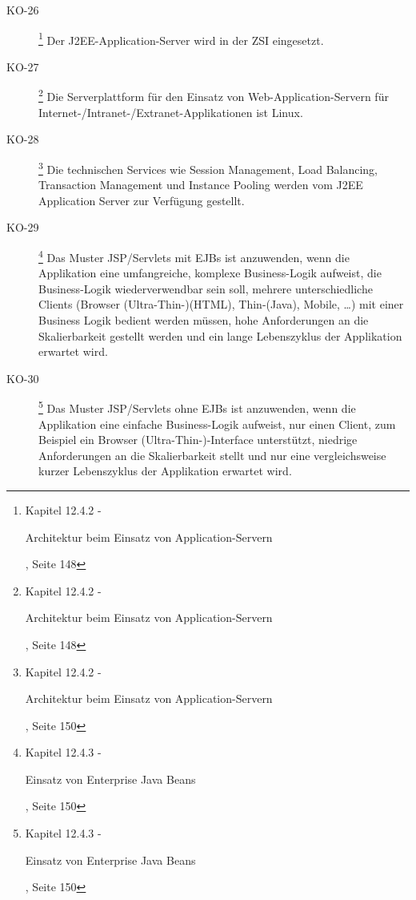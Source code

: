 \begin{description}
    \item[KO-26\label{itm:KO-26}]
    \footnote{\cite{ZkbHandbuchDerItArchitektur} Kapitel 12.4.2 -
    \begin{itshape}Architektur beim Einsatz von
    Application-Servern\end{itshape}, Seite 148}
    Der J2EE-Application-Server wird in der \ac{ZSI} eingesetzt.
    
    \item[KO-27\label{itm:KO-27}]
    \footnote{\cite{ZkbHandbuchDerItArchitektur} Kapitel 12.4.2 -
    \begin{itshape}Architektur beim Einsatz von
    Application-Servern\end{itshape}, Seite 148}
    Die Serverplattform für den Einsatz von Web-Application-Servern für
    Internet-/Intranet-/Extranet-Applikationen ist Linux.
    
    \item[KO-28\label{itm:KO-28}]
    \footnote{\cite{ZkbHandbuchDerItArchitektur} Kapitel 12.4.2 -
    \begin{itshape}Architektur beim Einsatz von
    Application-Servern\end{itshape}, Seite 150}
    Die technischen Services wie Session Management, Load Balancing,
    Transaction Management und Instance Pooling werden vom J2EE Application
    Server zur Verfügung gestellt.
    
    \item[KO-29\label{itm:KO-29}]
    \footnote{\cite{ZkbHandbuchDerItArchitektur} Kapitel 12.4.3 -
    \begin{itshape}Einsatz von Enterprise Java Beans\end{itshape}, Seite 150}
    Das Muster JSP/Servlets mit EJBs ist anzuwenden, wenn die Applikation eine
    umfangreiche, komplexe Business-Logik aufweist, die Business-Logik
    wiederverwendbar sein soll, mehrere unterschiedliche Clients (Browser
    (Ultra-Thin-)(HTML), Thin-(Java), Mobile, …) mit einer Business Logik
    bedient werden müssen, hohe Anforderungen an die Skalierbarkeit gestellt
    werden und ein lange Lebenszyklus der Applikation erwartet wird.
    
    \item[KO-30\label{itm:KO-30}]
    \footnote{\cite{ZkbHandbuchDerItArchitektur} Kapitel 12.4.3 -
    \begin{itshape}Einsatz von Enterprise Java Beans\end{itshape}, Seite 150}
    Das Muster JSP/Servlets ohne EJBs ist anzuwenden, wenn die Applikation eine
    einfache Business-Logik aufweist, nur einen Client, zum Beispiel ein
    Browser (Ultra-Thin-)-Interface unterstützt, niedrige Anforderungen an die
    Skalierbarkeit stellt und nur eine vergleichsweise kurzer Lebenszyklus der
    Applikation erwartet wird.
    

\end{description}
